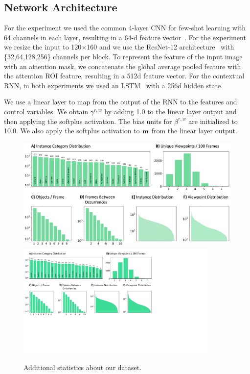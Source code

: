 \subsection{Network Architecture}
For the \ourchar{} experiment we used the common 4-layer CNN for few-shot learning with 64 channels
in each layer, resulting in a 64-d feature vector~\citep{protonet}. For the \ourroom{} experiment we
resize the input to 120$\times$160 and we use the ResNet-12 architecture~\citep{tadam} with
\{32,64,128,256\} channels per block. To represent the feature of the input image with an attention
mask, we concatenate the global average pooled feature with the attention ROI feature, resulting in
a 512d feature vector. For the contextual RNN, in both experiments we used an LSTM~\citep{lstm} with
a 256d hidden state. 

We use a linear layer to map from the output of the RNN to the features and control variables. We
obtain $\gamma^{r,w}$ by adding 1.0 to the linear layer output and then applying the softplus
activation. The bias units for $\beta^{r,w}$ are initialized to 10.0. We
also apply the softplus activation to $\mathbf{m}$ from the linear layer output.




\begin{figure}[t]
\vspace{-0.2in}
\centering
\iflatexml
\includegraphics[width=6\textwidth]{figures/statsfull.png}
\else
\includegraphics[width=0.9\textwidth,trim={0cm 7cm 10.2cm 0cm},clip]{figures/statsfull.pdf}
\fi
\caption{Additional statistics about our \ourroom{} dataset.}
\label{fig:additionalstats}
\end{figure}


